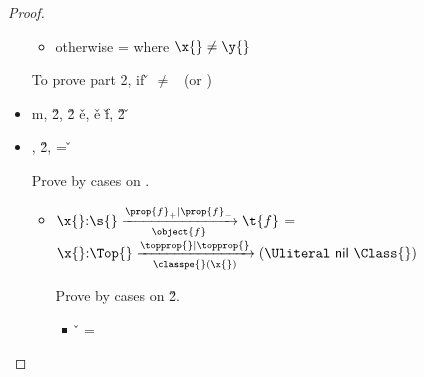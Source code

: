 \begin{lemma}
\begin{proof}
\begin{case}[T-App]
\begin{itemize}
\begin{subcase}[B-BetaClosure]
\begin{itemize}
\begin{itemize}
             \end{itemize}
           \item otherwise  = { {\y{}}} where $\x{} \not= \y{}$
         \end{itemize}


         To prove part 2, if \v{} $\not=$ \false\ (or \nil)
\end{subcase}
  \item[]
\begin{subcase}[B-BetaMulti]
  \opsem {\openv{}}
         {}
         { {m}},
  \opsem {\openv{}}
         {}
         {\v{2}},
  \opsem {\openv{}}
         { {\v{2}}}
         {\v{e}},
  \getmethod {\disptable{}}
             {\v{e}}
             {\v{f}},
  \opsem {\openv{}}
         { {\v{2}}}
         {\v{}}

\end{subcase}
  \item[]
\begin{subcase}[B-Delta]
  \opsem {\openv{}} {} {\const{}},
  \opsem {\openv{}} {} {\v{2}},
   = \v{}


  Prove by cases on \const{}.
  \begin{itemize}
    \item[] \begin{subcase}[\const{} = \classconst]
    ${\ArrowOne {\x{}} {\s{}}
                                                       {\t{f}}
                                                       {\filterset {\thenprop {\prop{f}}}
                                                                   {\elseprop {\prop{f}}}}
                                                       {\object{f}}}$
                                                       =
  ${\ArrowOne {\x{}} {\Top{}}
                                      {\Union{\nil{}}{\Class{}}}
                                      {\filterset {\topprop{}}
                                                  {\topprop{}}}
                                      {\path {\classpe{}} {\x{}}}}$

    Prove by cases on \v{2}.

        \begin{itemize}
          \item[] \begin{subcase}[\v{2} = \classvalue{\class{}} {\overrightarrow {\classfieldpair{\fld{i}} {\v{i}}}}]
                    \v{} = \class{}


\end{subcase}
\end{itemize}
\end{subcase}
\end{itemize}
\end{subcase}
\end{itemize}
\end{case}
\end{proof}
\end{lemma}
